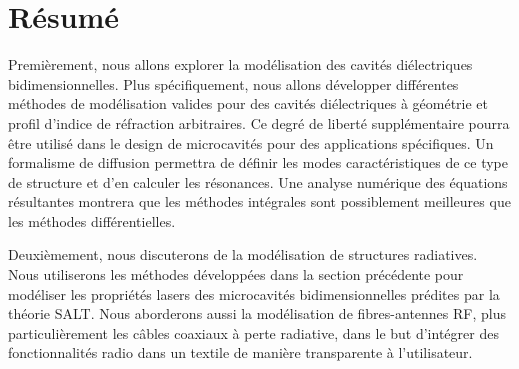 \chapter*{Résumé}

Premièrement, nous allons explorer la modélisation des
cavités diélectriques bidimensionnelles.
Plus spécifiquement, nous allons développer différentes méthodes
de modélisation valides pour des cavités diélectriques à géométrie et 
profil d'indice de réfraction arbitraires.
Ce
degré de liberté supplémentaire pourra être utilisé
dans le design de microcavités pour des applications
spécifiques. 
Un formalisme de diffusion permettra de définir les modes caractéristiques
de ce type de structure et d'en calculer les résonances. Une analyse
numérique des équations résultantes montrera que les méthodes intégrales
sont possiblement meilleures que les méthodes différentielles.

Deuxièmement, nous discuterons de la modélisation de structures
radiatives. Nous utiliserons les méthodes développées dans la section
précédente pour modéliser les propriétés lasers des microcavités
bidimensionnelles prédites par la théorie SALT. Nous aborderons
aussi la modélisation de fibres-antennes RF, plus particulièrement
les câbles coaxiaux à perte radiative, dans le but d'intégrer
des fonctionnalités radio dans un textile de manière transparente
à l'utilisateur. 

